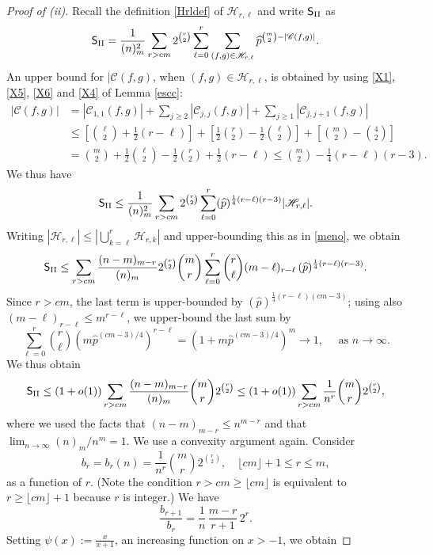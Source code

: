 \documentclass[reqno]{amsart}
\theoremstyle{theorem}
\theoremstyle{definition}
\theoremstyle{remark}
\def\CC{\mathscr{C}}
\def\HH{\mathscr{H}}
\newcommand{\1}{{\text{\Large $\mathfrak 1$}}}	%
\numberwithin{equation}{section}
\def\pmax{{\widehat p}}
\def\SSStwo{\mathsf S_{\text{\rm II}}}
\begin{document}
\begin{proof}[Proof of (ii)]
Recall the definition \eqref{Hrldef} of $\HH_{r,\ell}$
and write $\SSStwo$ as
\[
\SSStwo = \frac{1}{(n)_m^2}
\sum_{r > cm} 2^{\binom{r}{2}} 
\sum_{\ell=0}^r \sum_{(f,g) \in \HH_{r,\ell}} \pmax^{\binom{m}{2}-|\CC(f,g)|}.
\]
An upper bound for $|\CC(f,g)$, when $(f,g) \in \HH_{r,\ell}$, is
obtained by using
\eqref{X1}, \eqref{X5}, \eqref{X6} and \eqref{X4}
of Lemma \ref{escc}:
\begin{align*}
|\CC(f,g)| &= |\CC_{1,1}(f,g)| + \sum_{j \ge 2} |\CC_{j,j}(f,g)|
+ \sum_{j \ge 1} |\CC_{j,j+1}(f,g)|
\\
&\le \left[\binom{\ell}{2} + \frac12(r-\ell)\right]
+ \left[\frac12 \binom{r}{2} -\frac12\binom{\ell}{2}\right]
+ \left[\binom{m}{2} - \binom{4}{2}\right]
\\
&= \binom{m}{2} + \frac12\binom{\ell}{2} - \frac12 \binom{r}{2} + \frac12(r-\ell)
 \le \binom{m}{2} - \frac14 (r-\ell)(r-3).
\end{align*}
We thus have
\[ 
\SSStwo \le \frac{1}{(n)_m^2}
\sum_{r > cm} 2^{\binom{r}{2}} \sum_{\ell=0}^r 
(\pmax)^{\frac14 (r-\ell) (r-3)} |\HH_{r,\ell}|.
\]
Writing $|\HH_{r,\ell}| \le \left|\bigcup_{k=\ell}^r \HH_{r, k}\right|$ 
and upper-bounding this as in \eqref{meno}, we obtain
\[
\SSStwo \le 
\sum_{r > cm} 
\frac{(n - m)_{m - r}}{(n)_m}
2^{\binom{r}{2}} \binom{m}{r}
\sum_{\ell=0}^r \binom{r}{\ell} (m-\ell)_{r-\ell}
\, (\pmax)^{\frac14 (r-\ell) (r-3)} .
\]
Since $r>cm$, the last term is upper-bounded by
$(\pmax)^{\frac14 (r-\ell) (cm-3)}$; using also
$(m-\ell)_{r-\ell} \le m^{r-\ell}$, we upper-bound the last sum
by
\[
\sum_{\ell=0}^r \binom{r}{\ell} \left(m \pmax^{(cm-3)/4}\right)^{r-\ell}
= \left(1+m \pmax^{(cm-3)/4}\right)^m
\to 1, \quad \text{ as } n \to \infty.
\]
We thus obtain
\[
\SSStwo \le (1+o(1)) \sum_{r > cm}
\frac{(n - m)_{m - r}}{(n)_m} 
\binom{m}{r}
2^{\binom{r}{2}}
\le (1+o(1)) \sum_{r > cm} \frac{1}{n^r} \binom{m}{r}
2^{\binom{r}{2}},
\]
where we used the facts that $(n - m)_{m - r} \le n^{m-r}$
and that $\lim_{n \to \infty} (n)_m/n^m =1$.
We use a convexity argument again.
Consider
\[
b_r = b_r(n) = \frac{1}{n^r} \binom{m}{r} 2^{\binom{r}{2}},
\quad \lfloor cm \rfloor + 1 \le r \le m,
\]
as a function of $r$.
(Note the condition $r > cm \ge \lfloor cm \rfloor$ is equivalent to
$r \ge \lfloor cm \rfloor + 1$ because $r$ is integer.)
We have
\[
\frac{b_{r+1}}{b_r} = \frac1n\, \frac{m-r}{r+1}\, 2^r.
\]
Setting
$\psi (x) := \frac{x}{x+1}$,
an increasing function on $x > -1$,
we obtain %

\end{proof}
\end{document}
